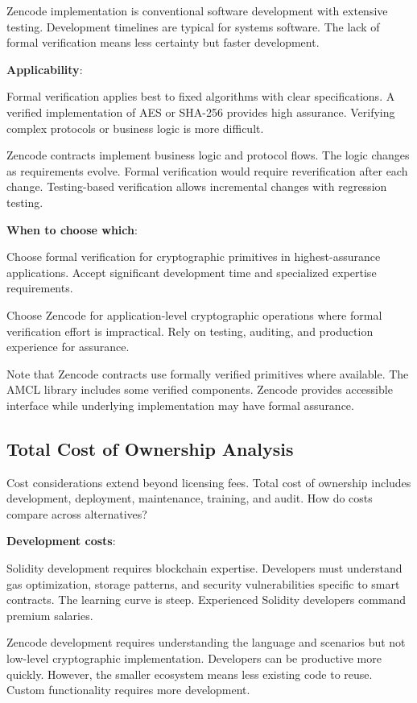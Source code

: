 Zencode implementation is conventional software development with
extensive testing. Development timelines are typical for systems
software. The lack of formal verification means less certainty but
faster development.

\textbf{Applicability}:

Formal verification applies best to fixed algorithms with clear
specifications. A verified implementation of AES or SHA-256 provides
high assurance. Verifying complex protocols or business logic is more
difficult.

Zencode contracts implement business logic and protocol flows. The
logic changes as requirements evolve. Formal verification would
require reverification after each change. Testing-based verification
allows incremental changes with regression testing.

\textbf{When to choose which}:

Choose formal verification for cryptographic primitives in
highest-assurance applications. Accept significant development time
and specialized expertise requirements.

Choose Zencode for application-level cryptographic operations where
formal verification effort is impractical. Rely on testing, auditing,
and production experience for assurance.

Note that Zencode contracts use formally verified primitives where
available. The AMCL library includes some verified components. Zencode
provides accessible interface while underlying implementation may have
formal assurance.

\subsection{Total Cost of Ownership Analysis}

Cost considerations extend beyond licensing fees. Total cost of
ownership includes development, deployment, maintenance, training, and
audit. How do costs compare across alternatives?

\textbf{Development costs}:

Solidity development requires blockchain expertise. Developers must
understand gas optimization, storage patterns, and security
vulnerabilities specific to smart contracts. The learning curve is
steep. Experienced Solidity developers command premium salaries.

Zencode development requires understanding the language and scenarios
but not low-level cryptographic implementation. Developers can be
productive more quickly. However, the smaller ecosystem means less
existing code to reuse. Custom functionality requires more
development.

